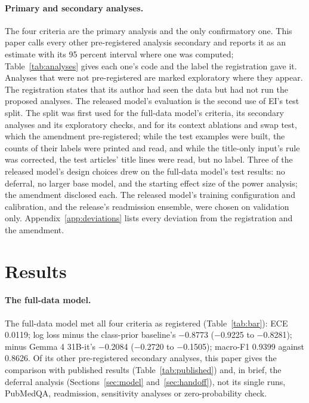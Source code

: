 \documentclass[11pt,letterpaper]{article}
\begin{document}
\paragraph{Primary and secondary analyses.} The four criteria are the primary analysis and the only confirmatory one. This paper calls every other pre-registered analysis secondary and reports it as an estimate with its 95 percent interval where one was computed; Table~\ref{tab:analyses} gives each one's code and the label the registration gave it. Analyses that were not pre-registered are marked exploratory where they appear. The registration states that its author had seen the data but had not run the proposed analyses. The released model's evaluation is the second use of EI's test split. The split was first used for the full-data model's criteria, its secondary analyses and its exploratory checks, and for its context ablations and swap test, which the amendment pre-registered; while the test examples were built, the counts of their labels were printed and read, and while the title-only input's rule was corrected, the test articles' title lines were read, but no label. Three of the released model's design choices drew on the full-data model's test results: no deferral, no larger base model, and the starting effect size of the power analysis; the amendment disclosed each. The released model's training configuration and calibration, and the release's readmission ensemble, were chosen on validation only. Appendix~\ref{app:deviations} lists every deviation from the registration and the amendment.

\section{Results}
\label{sec:results}

\paragraph{The full-data model.} The full-data model met all four criteria as registered (Table~\ref{tab:bar}): ECE 0.0119; log loss minus the class-prior baseline's $-$0.8773 ($-$0.9225 to $-$0.8281); minus Gemma 4 31B-it's $-$0.2084 ($-$0.2720 to $-$0.1505); macro-F1 0.9399 against 0.8626. Of its other pre-registered secondary analyses, this paper gives the comparison with published results (Table~\ref{tab:published}) and, in brief, the deferral analysis (Sections~\ref{sec:model} and~\ref{sec:handoff}), not its single runs, PubMedQA, readmission, sensitivity analyses or zero-probability check.
\end{document}
